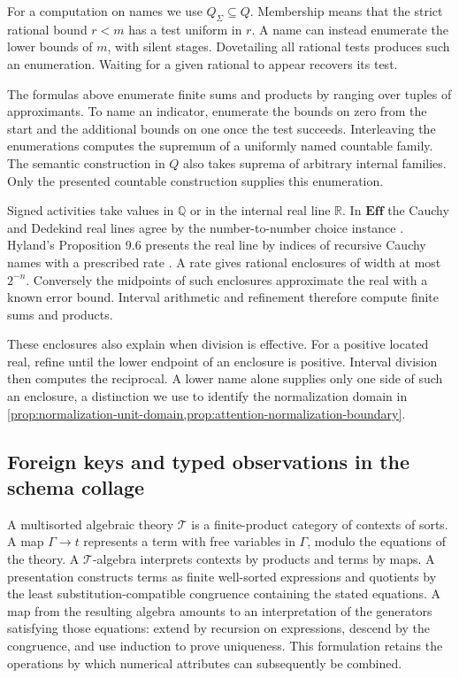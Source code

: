 \documentclass[11pt,a4paper]{article}
\theoremstyle{definition}
\theoremstyle{remark}\newaliascnt{remark}{theorem}
\newcommand{\E}{\mathbf{Eff}}
\newcommand{\Q}{\mathbb Q}
\newcommand{\R}{\mathbb R}
\numberwithin{equation}{section}
\begin{document}
For a computation on names we use $Q_\Sigma\subseteq Q$. Membership means that the strict rational bound $r<m$ has a test uniform in $r$. A name can instead enumerate the lower bounds of $m$, with silent stages. Dovetailing all rational tests produces such an enumeration. Waiting for a given rational to appear recovers its test.

The formulas above enumerate finite sums and products by ranging over tuples of approximants. To name an indicator, enumerate the bounds on zero from the start and the additional bounds on one once the test succeeds. Interleaving the enumerations computes the supremum of a uniformly named countable family. The semantic construction in $Q$ also takes suprema of arbitrary internal families. Only the presented countable construction supplies this enumeration.

Signed activities take values in $\Q$ or in the internal real line $\R$. In $\E$ the Cauchy and Dedekind real lines agree by the number-to-number choice instance \cite[\S9]{hyland}. Hyland's Proposition 9.6 presents the real line by indices of recursive Cauchy names with a prescribed rate \cite[\S9]{hyland}. A rate gives rational enclosures of width at most $2^{-n}$. Conversely the midpoints of such enclosures approximate the real with a known error bound. Interval arithmetic and refinement therefore compute finite sums and products.

These enclosures also explain when division is effective. For a positive located real, refine until the lower endpoint of an enclosure is positive. Interval division then computes the reciprocal. A lower name alone supplies only one side of such an enclosure, a distinction we use to identify the normalization domain in \cref{prop:normalization-unit-domain,prop:attention-normalization-boundary}.

\subsection{Foreign keys and typed observations in the schema collage}
A multisorted algebraic theory \(\mathcal T\) is a finite-product category of contexts of sorts. A map \(\Gamma\to t\) represents a term with free variables in \(\Gamma\), modulo the equations of the theory. A \(\mathcal T\)-algebra interprets contexts by products and terms by maps. A presentation constructs terms as finite well-sorted expressions and quotients by the least substitution-compatible congruence containing the stated equations. A map from the resulting algebra amounts to an interpretation of the generators satisfying those equations: extend by recursion on expressions, descend by the congruence, and use induction to prove uniqueness. This formulation retains the operations by which numerical attributes can subsequently be combined.
\end{document}
